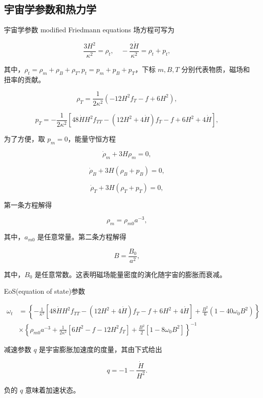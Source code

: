 \documentclass[9pt, dvipsnames]{beamer} %
\begin{document}
\subsection{宇宙学参数和热力学}

\begin{frame}{宇宙学参数}
    modified Friedmann equations 场方程可写为

    $$
    \frac{3 H^2 }{\kappa^2 } = \rho_t,\quad
    -\frac{2\dot{H} }{\kappa^2 }  = \rho_t + p_t,
    $$
    
    其中，$\rho_t=\rho_m+\rho_B+\rho_T,p_t=p_m+p_B+p_T$，下标 $m,B,T$ 分别代表物质，磁场和扭率的贡献。

    $$
    \rho_T = \frac{1 }{2\kappa^2 } \left(-12 H^2 f_T - f + 6H^2 \right),
    $$

    $$
    p_T = -\frac{1 }{2\kappa^2 } \left[48\dot{H}H^2 f_{TT} - \left(12 H^2 + 4\dot{H} \right) f_T - f + 6 H^2 + 4\dot{H} \right],
    $$

    为了方便，取 $p_m=0$，能量守恒方程

    $$
    \dot{\rho}_m + 3H \rho_m = 0,
    $$

    $$
    \dot{\rho}_B + 3H\left(\rho_B + p_B \right) = 0,
    $$

    $$
    \dot{\rho}_T + 3H\left(\rho_T + p_T \right) = 0,
    $$

\end{frame}

\begin{frame}
    第一条方程解得

    $$
    \rho_m = \rho_{m0} a^{-3},
    $$

    其中，$a_{m0}$ 是任意常量。第二条方程解得

    $$
    B=\frac{B_0}{a^2},
    $$

    其中，$B_0$ 是任意常数。这表明磁场能量密度的演化随宇宙的膨胀而衰减。

    EoS(equation of state)参数

    $$
    \begin{aligned}
        \omega_t
        &=\left\{-\frac{1 }{\kappa^2 } \left[48\dot{H}H^2 f_{TT} - \left(12 H^2 + 4\dot{H} \right) f_T - f + 6 H^2 + 4\dot{H} \right] + \frac{B^2 }{6 } \left(1-40\omega_0 B^2 \right) \right\} \\
        &\times \left\{\rho_{m0} a^{-3} + \frac{1 }{2\kappa^2 } \left[6 H^2 - f-12 H^2 f_T \right] + \frac{B^2 }{2 } \left[1-8\omega_0 B^2 \right] \right\}^{-1}
        \end{aligned}
    $$

    减速参数 $q$ 是宇宙膨胀加速度的度量，其由下式给出

    $$
    q = -1 - \frac{\dot{H} }{H^2 } .
    $$

    负的 $q$ 意味着加速状态。

\end{frame}
\end{document}
